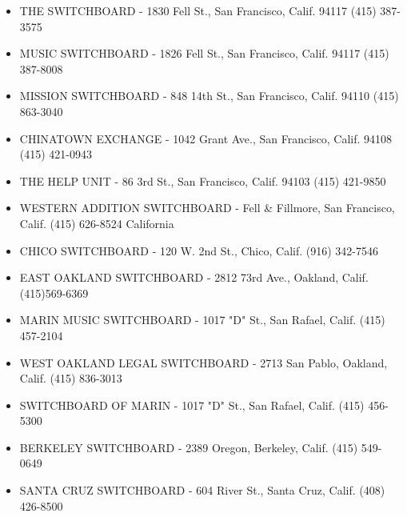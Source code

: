 \documentclass[11pt,twoside,a4paper]{book}
\begin{document}
\begin{minipage}[t]{0.20\textwidth}
\begin{scriptsize}
\begin{itemize}
	\item[] THE SWITCHBOARD - 1830 Fell St., San Francisco, Calif. 94117 (415) 387-3575 
	\item[] MUSIC SWITCHBOARD - 1826 Fell St., San Francisco, Calif. 94117 (415) 387-8008 
	\item[] MISSION SWITCHBOARD - 848 14th St., San Francisco, Calif. 94110 (415) 863-3040 
	\item[] CHINATOWN EXCHANGE - 1042 Grant Ave., San Francisco, Calif. 94108 (415) 421-0943 
	\item[] THE HELP UNIT - 86 3rd St., San Francisco, Calif. 94103 (415) 421-9850 
	\item[] WESTERN ADDITION SWITCHBOARD - Fell \& Fillmore, San Francisco, Calif. (415) 626-8524 	California 
	\item[] CHICO SWITCHBOARD - 120 W. 2nd St., Chico, Calif. (916) 342-7546 
	\item[] EAST OAKLAND SWITCHBOARD - 2812 73rd Ave., Oakland, Calif. (415)569-6369 
	\item[] MARIN MUSIC SWITCHBOARD - 1017 "D" St., San Rafael, Calif. (415) 457-2104 
	\item[] WEST OAKLAND LEGAL SWITCHBOARD - 2713 San Pablo, Oakland, Calif. (415) 836-3013 
	\item[] SWITCHBOARD OF MARIN - 1017 "D" St., San Rafael, Calif. (415) 456-5300 
	\item[] BERKELEY SWITCHBOARD - 2389 Oregon, Berkeley, Calif. (415) 549-0649 
	\item[] SANTA CRUZ SWITCHBOARD - 604 River St., Santa Cruz, Calif. (408) 426-8500 
\end{itemize}
\end{scriptsize}
\end{minipage}\hfill
\end{document}

